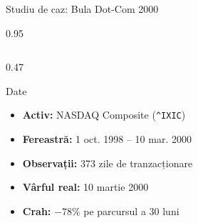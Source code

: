 \documentclass[9pt, aspectratio=169, t]{beamer}
\begin{document}
\begin{frame}{Studiu de caz: Bula Dot-Com 2000}
    \begin{cminipage}{0.95\textwidth}
    {\footnotesize
    \begin{columns}[T]
        \begin{column}{0.47\textwidth}
            \begin{block}{Date}
                \begin{itemize}\setlength{\itemsep}{0pt}
                    \item \textbf{Activ:} NASDAQ Composite (\texttt{\^{}IXIC})
                    \item \textbf{Fereastră:} 1 oct. 1998 -- 10 mar. 2000
                    \item \textbf{Observații:} 373 zile de tranzacționare
                    \item \textbf{Vârful real:} 10 martie 2000
                    \item \textbf{Crah:} $-78\%$ pe parcursul a 30 luni
                \end{itemize}
            \end{block}


\end{column}
\end{columns}}
\end{cminipage}
\end{frame}
\end{document}
